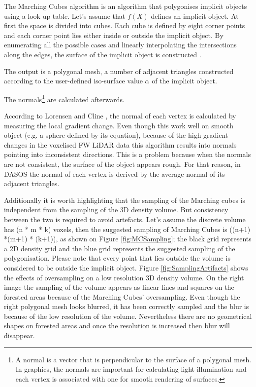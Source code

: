 \documentclass{subfiles}
\begin{document}
\par The Marching Cubes algorithm is an algorithm that polygonises implicit objects using a look up table. Let’s assume that $f(X)$ defines an implicit object. At first the space is divided into cubes. Each cube is defined by eight corner points and each corner point lies either inside or outside the implicit object. By enumerating all the possible cases and linearly interpolating the intersections along the edges, the surface of the implicit object is constructed \cite{Lorensen1987}. {\color{Fuchsia} The output is a polygonal mesh, a number of adjacent triangles constructed according to the user-defined iso-surface value $\alpha$  of the implicit object.
	
\par  The normals\footnote{ A normal is a vector that is perpendicular to the surface of a polygonal mesh. In graphics, the normals are important for calculating light illumination and each vertex is associated with one for smooth rendering of surfaces.} are calculated afterwards.} According to Lorensen and Cline \cite{Lorensen1987}, the normal of each vertex is calculated by measuring the local gradient change. Even though this work well on smooth object (e.g. a sphere defined by its equation), because of the high gradient changes in the voxelised FW LiDAR data this algorithm results into normals pointing into inconsistent directions. This is a problem because when the normals are not consistent, the surface of the object appears rough. For that reason, in DASOS the normal of each vertex is derived by the average normal of its adjacent triangles. 




\par Additionally it is worth highlighting that the sampling of the Marching cubes is independent from the sampling of the 3D density volume. But consistency between the two is required to avoid artefacts. Let’s assume the discrete volume has (n * m * k) voxels, then the suggested sampling of Marching Cubes is ((n+1) *(m+1) * (k+1)), as shown on Figure \ref{fig:MCSampling}; the black grid represents a 2D density grid and the blue grid represents the suggested sampling of the polygonisation. Please note that every point that lies outside the volume is considered to be outside the implicit object. {\color{Fuchsia} Figure \ref{fig:SamplingArtifacts} shows the effects of oversampling on a low resolution 3D density volume. On the right image the sampling of the volume appears as linear lines and squares on the forested areas because of the Marching Cubes' oversampling. Even though the right polygonal mesh looks blurred, it has been correctly sampled and the blur is because of the low resolution of the volume. Nevertheless there are no geometrical shapes on forested areas and once the resolution is increased then blur will disappear. }
\end{document}
